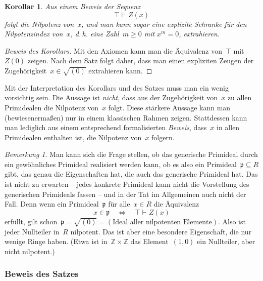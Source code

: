 \documentclass[a4paper,ngerman,12pt]{scrartcl}
\theoremstyle{definition}
\theoremstyle{plain}
\newtheorem{kor}[defn]{Korollar}
\theoremstyle{remark}
\newtheorem{bem}[defn]{Bemerkung}
\newcommand{\ZZ}{\mathbb{Z}}
\newcommand{\pp}{\mathfrak{p}}
\newcommand{\seq}[1]{\mathrel{\vdash\!\!\!_{#1}}}
\renewcommand{\_}{\mathpunct{.}\,}
\newcommand{\?}{\,{:}\,}
\begin{document}
\begin{kor}Aus einem Beweis der Sequenz
\[ \top \seq{} Z(x) \]
folgt die Nilpotenz von~$x$, und man kann sogar eine explizite Schranke
für den Nilpotenzindex von~$x$, d.\,h. eine Zahl~$m \geq 0$ mit $x^m = 0$,
extrahieren.
\end{kor}
\begin{proof}[Beweis des Korollars] Mit den Axiomen kann man die Äquivalenz
von~$\top$ mit~$Z(0)$ zeigen. Nach dem Satz folgt daher, dass man einen
expliziten Zeugen der Zugehörigkeit~$x \in \sqrt{(0)}$ extrahieren
kann.\end{proof}

Mit der Interpretation des Korollars und des Satzes muss man ein wenig
vorsichtig sein. Die Aussage ist \emph{nicht}, dass aus der Zugehörigkeit
von~$x$ zu allen Primidealen die Nilpotenz von~$x$ folgt. Diese stärkere
Aussage kann man (bewiesenermaßen) nur in einem klassischen Rahmen zeigen.
Stattdessen kann man lediglich aus einem entsprechend formalisierten
\emph{Beweis}, dass~$x$ in allen Primidealen enthalten ist, die Nilpotenz
von~$x$ folgern.

\begin{bem}
Man kann sich die Frage stellen, ob das generische Primideal durch ein
gewöhnliches Primideal realisiert werden kann, ob es also ein Primideal~$\pp
\subseteq R$ gibt, das genau die Eigenschaften hat, die auch das generische
Primideal hat. Das ist nicht zu erwarten -- jedes konkrete Primideal kann nicht
die Vorstellung des generischen Primideals fassen -- und in der Tat im
Allgemeinen auch nicht der Fall. Denn wenn ein Primideal~$\pp$ für alle~$x \in
R$ die Äquivalenz
\[ x \in \pp \quad\Longleftrightarrow\quad \top \seq{} Z(x) \]
erfüllt, gilt schon~$\pp = \sqrt{(0)} = (\text{Ideal aller nilpotenten
Elemente})$. Also ist jeder Nullteiler in~$R$ nilpotent. Das ist aber eine
besondere Eigenschaft, die nur wenige Ringe haben. (Etwa ist in~$\ZZ \times
\ZZ$ das Element~$(1,0)$ ein Nullteiler, aber nicht nilpotent.)
\end{bem}


\subsubsection*{Beweis des Satzes}
\end{document}
